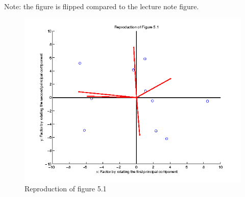 \documentclass[paper=a4, fontsize=11pt]{scrartcl} %
\numberwithin{equation}{section} %
\numberwithin{figure}{section} %
\numberwithin{table}{section} %
\begin{document}
Note: the figure is flipped compared to the lecture note figure.

\begin{figure}[H]
  \centering
  \includegraphics[scale=.7]{reproduct51}
  \caption{Reproduction of figure 5.1}
\end{figure}
\end{document}

